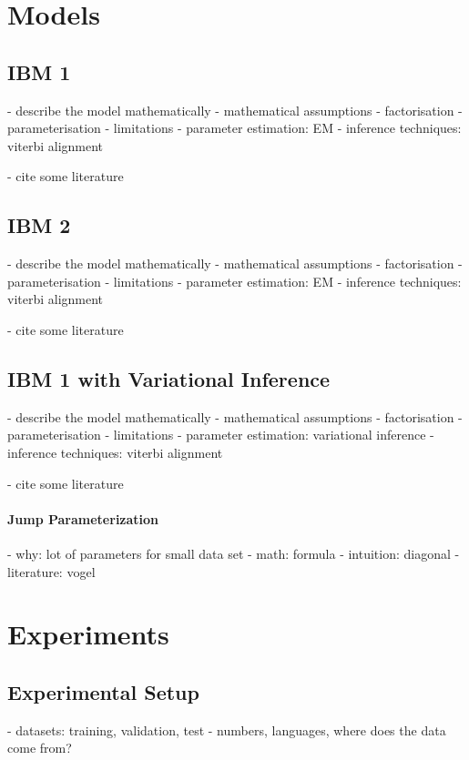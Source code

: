 \documentclass[11pt,a4paper]{article}
\begin{document}
\section{Models}

\subsection{IBM 1}
- describe the model mathematically
- mathematical assumptions
- factorisation
- parameterisation
- limitations
- parameter estimation: EM
- inference techniques: viterbi alignment

- cite some literature

\subsection{IBM 2}
- describe the model mathematically
- mathematical assumptions
- factorisation
- parameterisation
- limitations
- parameter estimation: EM
- inference techniques: viterbi alignment

- cite some literature

\subsection{IBM 1 with Variational Inference}

- describe the model mathematically
- mathematical assumptions
- factorisation
- parameterisation
- limitations
- parameter estimation: variational inference
- inference techniques: viterbi alignment

- cite some literature

\paragraph{Jump Parameterization}
- why: lot of parameters for small data set
- math: formula
- intuition: diagonal
- literature: vogel


\section{Experiments}
\label{Experiments}

\subsection{Experimental Setup}
\label{ExperimentalSetup}

- datasets: training, validation, test
- numbers, languages, where does the data come from?
\end{document}
